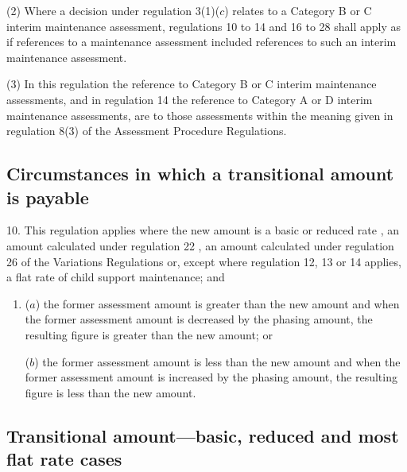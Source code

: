 \documentclass[12pt,a4paper]{article}
\begin{document}
(2) Where a decision under regulation 3(1)($c$)  relates to a Category B or C interim maintenance assessment, 
regulations 10 to 14 and 16 to 28  %
shall apply as if references to a maintenance assessment included references to such an interim maintenance assessment.

(3) In this regulation the reference to Category B or C interim maintenance assessments, and in regulation 14 the reference to Category A or D interim maintenance assessments, are to those assessments within the meaning given in regulation 8(3) of the Assessment Procedure Regulations.


\subsection[10. Circumstances in which a transitional amount is payable]{Circumstances in which a transitional amount is payable}

10.  This regulation applies where the new amount is a basic or reduced rate%
, an amount calculated under regulation 22%
, an amount calculated under regulation 26 of the Variations Regulations  %
or, except where regulation 12, 13 or 14 applies, a flat rate of child support maintenance; and
\begin{enumerate}\item[]
($a$) the former assessment amount is greater than the new amount and when the former assessment amount is decreased by the phasing amount, the resulting figure is greater than the new amount; or

($b$) the former assessment amount is less than the new amount and when the former assessment amount is increased by the phasing amount, the resulting figure is less than the new amount.
\end{enumerate}


\subsection[11. Transitional amount—basic, reduced and most flat rate cases]{\sloppy Transitional amount—basic, reduced and most flat rate cases}
\end{document}
